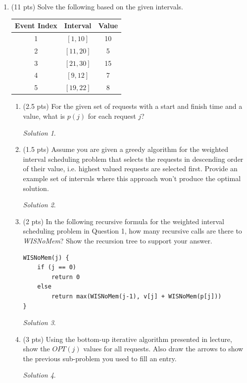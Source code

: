 \documentclass[12pt]{article}
\theoremstyle{remark}
\newtheorem*{solution}{Solution}
\begin{document}
\begin{enumerate}

\item (11 pts) Solve the following based on the given intervals.
\begin{center}
\begin{tabular}{c|c|c}
Event Index & Interval & Value\\ \hline
1 & $[1, 10]$ & 10\\ 
2 & $[11, 20]$  & 5\\
3 & $[21, 30]$  & 15\\
4 & $[9, 12]$ & 7\\
5 & $[19, 22]$ & 8
\end{tabular}
\end{center}

\begin{enumerate}

\item (2.5 pts) For the given set of requests with a start and finish time and a value, what is $p(j)$ for each request $j$?

\begin{solution}

\end{solution}

\item (1.5 pts) Assume you are given a greedy algorithm for the weighted interval scheduling problem that selects the requests in descending order of their value, i.e. highest valued requests are selected first. Provide an example set of intervals where this approach won't produce the optimal solution.
\begin{solution}

\end{solution}

\pagebreak
\item (2 pts) In the following recursive formula for the weighted interval scheduling problem in Question 1, how many recursive calls are there to \textit{WISNoMem}? Show the recursion tree to support your answer.
\begin{verbatim}
WISNoMem(j) {
    if (j == 0) 
        return 0
    else 
        return max(WISNoMem(j-1), v[j] + WISNoMem(p[j]))
}
\end{verbatim}

\begin{solution}

\end{solution}

\pagebreak
\item (3 pts) Using the bottom-up iterative algorithm presented in lecture, show the $OPT(j)$ values for all requests. Also draw the arrows to show the previous sub-problem you used to fill an entry. 
\begin{solution}


\end{solution}
\end{enumerate}
\end{enumerate}
\end{document}
